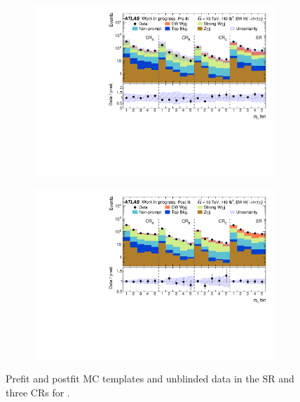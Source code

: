 
\begin{figure}[H]
\centering
\begin{subfigure}[b]{\textwidth}
    \centering
    \includegraphics[width=\textwidth]{plots/diffx/stacks/preFit_stack_ly_m_WIP_12Feb.pdf}
    \caption{}
\end{subfigure}
\hfill
\begin{subfigure}[b]{\textwidth}
    \centering
    \includegraphics[width=\textwidth]{plots/diffx/stacks/postFit_stack_ly_m_WIP_12Feb.pdf}
    \caption{}
\end{subfigure}
\caption{Prefit and postfit MC templates and unblinded data in the SR and three CRs for \lym.}
\label{fig:lym_templates}
\end{figure}

